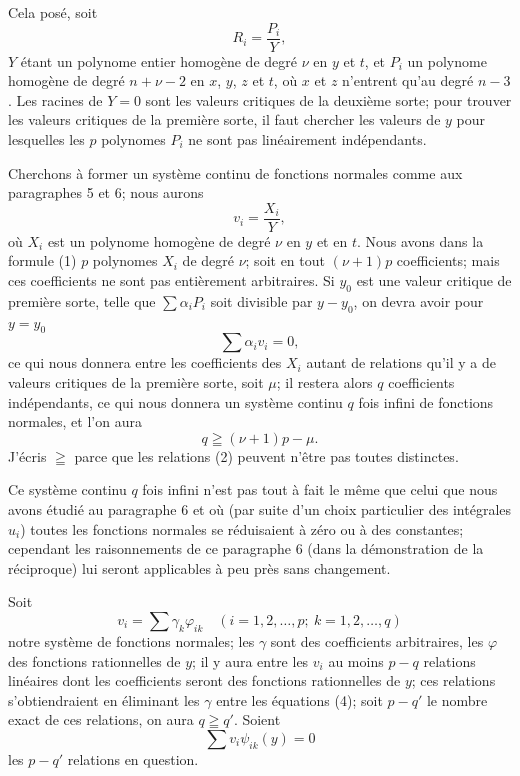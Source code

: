 \documentclass{article}
\begin{document}
Cela posé, soit
\[
R_{i} = \frac{P_{i}}{Y},
\]
$Y$ étant un polynome entier homogène de degré $\nu$ en $y$ et $t$, et $P_{i}$ un polynome homogène de degré $n + \nu - 2$ en $x$, $y$, $z$ et $t$, où $x$ et $z$ n'entrent qu'au degré $n - 3$. Les racines de $Y = 0$ sont les valeurs critiques de la deuxième sorte; pour trouver les valeurs critiques de la première sorte, il faut chercher les valeurs de $y$ pour lesquelles les $p$ polynomes $P_{i}$ ne sont pas linéairement indépendants.

Cherchons à former un système continu de fonctions normales comme aux paragraphes 5 et 6; nous aurons
\[
v_{i} = \frac{X_{i}}{Y}, \tag{1}
\]
où $X_{i}$ est un polynome homogène de degré $\nu$ en $y$ et en $t$. Nous avons dans la formule (1) $p$ polynomes $X_{i}$ de degré $\nu$; soit en tout $(\nu + 1)p$ coefficients; mais ces coefficients ne sont pas entièrement arbitraires. Si $y_{0}$ est une valeur critique de première sorte, telle que $\displaystyle\sum \alpha_{i} P_{i}$ soit divisible par $y - y_{0}$, on devra avoir pour $y = y_{0}$
\[
\sum \alpha_{i} v_{i} = 0, \tag{2}
\]
ce qui nous donnera entre les coefficients des $X_{i}$ autant de relations qu'il y a de valeurs critiques de la première sorte, soit $\mu$; il restera alors $q$ coefficients indépendants, ce qui nous donnera un système continu $q$ fois infini de fonctions normales, et l'on aura
\[
q \geqq (\nu + 1)p - \mu. \tag{3}
\]
J'écris $\geqq$ parce que les relations (2) peuvent n'être pas toutes distinctes.

Ce système continu $q$ fois infini n'est pas tout à fait le même que celui que nous avons étudié au paragraphe 6 et où (par suite d'un choix particulier des intégrales $u_{i}$) toutes les fonctions normales se réduisaient à zéro ou à des constantes; cependant les raisonnements de ce paragraphe 6 (dans la démonstration de la réciproque) lui seront applicables à peu près sans changement.

Soit
\[
v_{i} = \sum \gamma_{k}\varphi_{ik} \quad (i = 1, 2, \ldots, p; \ k = 1, 2, \ldots, q) \tag{4}
\]
notre système de fonctions normales; les $\gamma$ sont des coefficients arbitraires, les $\varphi$ des fonctions rationnelles de $y$; il y aura entre les $v_{i}$ au moins $p - q$ relations linéaires dont les coefficients seront des fonctions rationnelles de $y$; ces relations s'obtiendraient en éliminant les $\gamma$ entre les équations (4); soit $p - q'$ le nombre exact de ces relations,
on aura $q \geqq q'$. Soient
\[
\sum v_{i}\psi_{ik}(y) = 0 \tag{5}
\]
les $p - q'$ relations en question.
\end{document}

